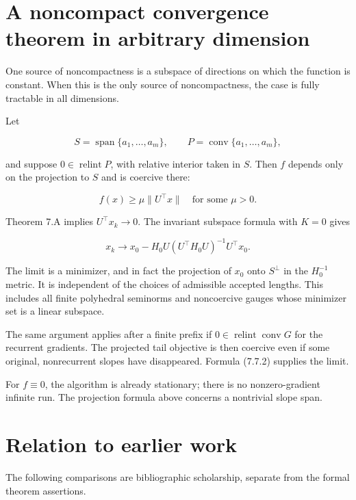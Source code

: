\setcounter{section}{7}
\setcounter{theorem}{0}
\setcounter{lemma}{0}
\setcounter{corollary}{0}
\setcounter{proposition}{0}
\setcounter{remark}{0}
\setcounter{equation}{0}


\section{A noncompact convergence theorem in arbitrary
dimension}\label{H:a-noncompact-convergence-theorem-in-arbitrary-dimension}


One source of noncompactness is a subspace of directions on which the
function is constant. When this is the only source of noncompactness,
the case is fully tractable in all dimensions.

Let

\[
S=\operatorname{span}\{a_1,\ldots,a_m\},\qquad
P=\operatorname{conv}\{a_1,\ldots,a_m\},
\]

and suppose \(0\in\operatorname{relint}P\), with relative interior taken
in \(S\). Then \(f\) depends only on the projection to \(S\) and is
coercive there:

\[
f(x)\ge\mu\|U^\top x\|\quad\text{for some }\mu>0.
\]

Theorem 7.A implies \(U^\top x_k\to0\). The invariant subspace formula
with \(K=0\) gives

\[
\boxed{
x_k\longrightarrow
x_0-H_0U(U^\top H_0U)^{-1}U^\top x_0.
}
\tag{7.8.1}
\]

The limit is a minimizer, and in fact the projection of \(x_0\) onto
\(S^\perp\) in the \(H_0^{-1}\) metric. It is independent of the choices
of admissible accepted lengths. This includes all finite polyhedral
seminorms and noncoercive gauges whose minimizer set is a linear
subspace.

The same argument applies after a finite prefix if
\(0\in\operatorname{relint}\operatorname{conv}G\) for the recurrent
gradients. The projected tail objective is then coercive even if some
original, nonrecurrent slopes have disappeared. Formula (7.7.2) supplies
the limit.

For \(f\equiv0\), the algorithm is already stationary; there is no
nonzero-gradient infinite run. The projection formula above concerns a
nontrivial slope span.


\endgroup


\section*{Relation to earlier work}
The following comparisons are bibliographic scholarship, separate from the formal theorem assertions.

